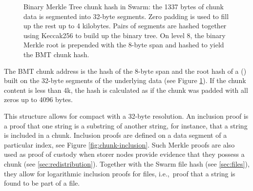 \begin{figure}[htbp]
   \centering
   \resizebox{1\textwidth}{!}{
   }
   \caption[BMT: Binary Merkle Tree hash used as chunk hash in Swarm \statusgreen]{Binary Merkle Tree chunk hash in Swarm: the 1337 bytes of chunk data is segmented into 32-byte segments. Zero padding is used to fill up the rest up to 4 kilobytes. Pairs of segments are hashed together using Keccak256 to build up the binary tree. On level 8, the binary Merkle root is prepended with the 8-byte span and hashed to yield the BMT chunk hash.}
   \label{fig:BMT}
\end{figure}

The BMT chunk address is the hash of the 8-byte span and the root hash of a  () built on the 32-byte segments of the underlying data (see Figure \ref{fig:BMT}). If the chunk content is less than 4k, the hash is calculated as if the chunk was padded with all zeros up to 4096 bytes.

This structure allows for compact  with a 32-byte resolution. An inclusion proof is a proof that one string is a substring of another string, for instance, that a string is included in a chunk. Inclusion proofs are defined on a data segment of a particular index, see Figure \ref{fig:chunk-inclusion}. Such Merkle proofs are also used as proof of custody when storer nodes provide evidence that they possess a chunk (see \ref{sec:redistribution}). Together with the Swarm file hash (see \ref{sec:files}), they allow for logarithmic inclusion proofs for files, i.e.,\ proof that a string is found to be part of a file.


